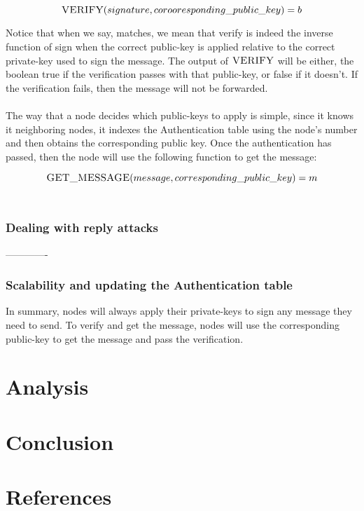 \documentclass[letterpaper]{article}
\begin{document}
$$\textsc{VERIFY}(signature, corooresponding\_public\_key) =  b $$

Notice that when we say, matches, we mean that verify is indeed the inverse function of sign when the correct public-key is applied relative to the correct private-key used to sign the message.
The output of $\textsc{VERIFY}$ will be either, the boolean true if the verification passes with that public-key, or false if it doesn't. If the verification fails, then the message will not be forwarded. 
\\
\\
The way that a node decides which public-keys to apply is simple, since it knows it neighboring nodes, it indexes the Authentication table using the node's number and then obtains the corresponding public key.
Once the authentication has passed, then the node will use the following function to get the message:

$$\textsc{GET\_MESSAGE}(message, corresponding\_public\_key) = m$$
\\

\subsubsection{Dealing with reply attacks }


-------------


\subsubsection{Scalability and updating the Authentication table}

In summary, nodes will always apply their private-keys to sign any message they need to send. To verify and get the message, nodes will use the corresponding public-key to get the message and pass the verification.

\section{Analysis}

\section{Conclusion}

\section{References}
\end{document}
